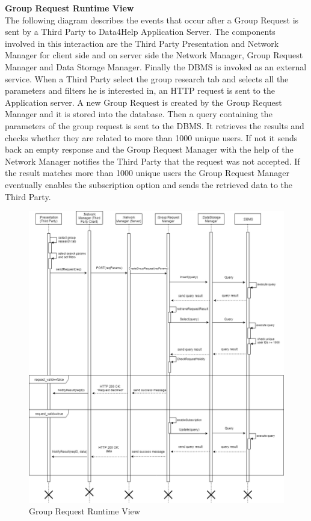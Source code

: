 \documentclass[titlepage]{article}
\begin{document}
{\bf Group Request Runtime View }\\ 
The following diagram describes the events that occur after a Group Request is sent by a Third Party to Data4Help Application Server. The components involved in this interaction are the Third Party Presentation and Network Manager for client side and  on server side the Network Manager, Group Request Manager and Data Storage Manager. Finally the DBMS is invoked as an external service.
When a Third Party select the group research tab and selects all the parameters and filters he is interested in, an HTTP request is sent to the Application server. A new Group Request is created by the Group Request Manager and it is stored into the database. Then a query containing the parameters of the group request is sent to the DBMS. It retrieves the results and checks whether they are related to more than 1000 unique users. If not it sends back an empty response and the Group Request Manager with the help of the Network Manager notifies the Third Party that the request was not accepted. If the result matches more than 1000 unique users the Group Request Manager eventually enables the subscription option and sends the retrieved data to the Third Party.

\begin{figure}[H]
	\center
  	\includegraphics[width=15cm]{GroupRequest.png}
  	\caption{Group Request Runtime View}
 	\label{fig:GRPREQ}
\end{figure}
\end{document}
